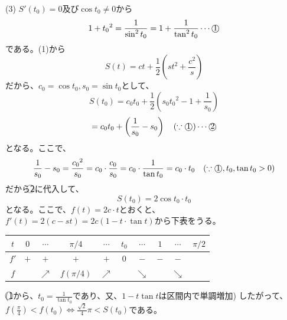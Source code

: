 \documentclass[../main.tex]{subfiles}
\begin{document}
(3) $S'(t_0) = 0$及び$\cos t_0 \neq 0$から
$$
1 + {t_0}^2 = \frac{1}{\sin^2 t_0} = 1 + \frac{1}{\tan^2 t_0} \cdots \text{\textcircled{1}}
$$
である。(1)から
$$
S(t) = ct + \frac{1}{2}\left(st^2 + \frac{c^2}{s}\right)
$$
だから、$c_0 = \cos t_0, s_0 = \sin t_0$として、
$$
S(t_0) = c_0 t_0 + \frac{1}{2}\left( s_0 {t_0}^2 - 1 + \frac{1}{s_0} \right)
$$
$$
= c_0 t_0 + \left( \frac{1}{s_0} - s_0 \right) \quad (\because \text{\textcircled{1}}) \cdots \text{\textcircled{2}}
$$
となる。ここで、
$$
\frac{1}{s_0} - s_0 = \frac{{c_0}^2}{s_0} = c_0 \cdot \frac{c_0}{s_0} = c_0 \cdot \frac{1}{\tan t_0} = c_0 \cdot t_0 \quad (\because \text{\textcircled{1}}, t_0, \tan t_0 > 0)
$$
だから\textcircled{2}に代入して、
$$
S(t_0) = 2 \cos t_0 \cdot t_0
$$
となる。ここで、$f(t) = 2 c \cdot t$とおくと、$f'(t) = 2(c - st) = 2c(1 - t \cdot \tan t)$から下表をうる。
\begin{center}
  \begin{tabular}{|c|c|c|c|c|c|c|c|c|c|}
    \hline
    $t$ & $0$ & $\cdots$ & $\pi/4$ & $\cdots$ & $t_0$ & $\cdots$ & $1$ & $\cdots$ & $\pi/2$ \\ \hline
    $f'$ & $+$ & $+$ & $+$ & $+$ & $0$ & $-$ & $-$ & $-$ & \\ \hline
    $f$ & & $\nearrow$ & $f(\pi/4)$ & $\nearrow$ & & $\searrow$ & & $\searrow$ & \\ \hline
  \end{tabular}
\end{center}
(\textcircled{1}から、$t_0 = \frac{1}{\tan t_0}$であり、又、$1 - t \tan t$は区間内で単調増加)
したがって、$f(\frac{\pi}{4}) < f(t_0) \Leftrightarrow \frac{\sqrt{2}}{4}\pi < S(t_0)$である。
\end{document}
